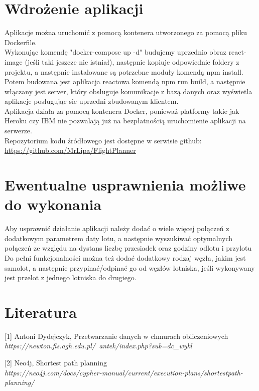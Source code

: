\documentclass[12pt]{article}
\begin{document}
\section{Wdrożenie aplikacji}
Aplikacje można uruchomić z pomocą kontenera utworzonego za pomocą pliku Dockerfile.\\
Wykonując komendę "docker-compose up -d" budujemy uprzednio obraz react-image (jeśli taki jeszcze nie istniał), następnie
kopiuje odpowiednie foldery z projektu, a następnie instalowane są potrzebne moduły komendą npm install. Potem budowana jest aplikacja reactowa komendą npm run build, a następnie włączany jest server, który obsługuje komunikacje z bazą danych oraz wyświetla aplikacje posługując sie uprzedni zbudowanym klientem.\\
Aplikacja działa za pomocą kontenera Docker, ponieważ platformy takie jak Heroku czy IBM nie pozwalają już na bezpłatnością uruchomienie aplikacji na serwerze.\\
Repozytorium kodu źródłowego jest dostępne w serwisie github:\\
\href{https://github.com/MrLipa/FlightPlanner}{https://github.com/MrLipa/FlightPlanner}

\section{Ewentualne usprawnienia możliwe do wykonania}
Aby usprawnić działanie aplikacji należy dodać o wiele więcej połączeń z dodatkowym parametrem daty lotu, a następnie wyszukiwać optymalnych połączeń ze względu na dystans liczbę przesiadek oraz godziny odlotu i przylotu\\
Do pełni funkcjonalności można też dodać dodatkowy rodzaj węzła, jakim jest samolot, a następnie przypinać/odpinać go od węzłów lotniska, jeśli wykonywany jest przelot z jednego lotniska do drugiego.

\section{Literatura}
\begin{description}
\item {[1]} Antoni Dydejczyk, Przetwarzanie danych w chmurach obliczeniowych\\
\textit{https://newton.fis.agh.edu.pl/~antek/index.php?sub=dc\_wykl}
\item {[2]} Neo4j, Shortest path planning\\
\textit{https://neo4j.com/docs/cypher-manual/current/execution-plans/shortestpath-planning/}
\end{description}
\end{document}
